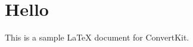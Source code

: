 \documentclass{article}
\begin{document}
\section{Hello}
This is a sample LaTeX document for ConvertKit.
\end{document}
